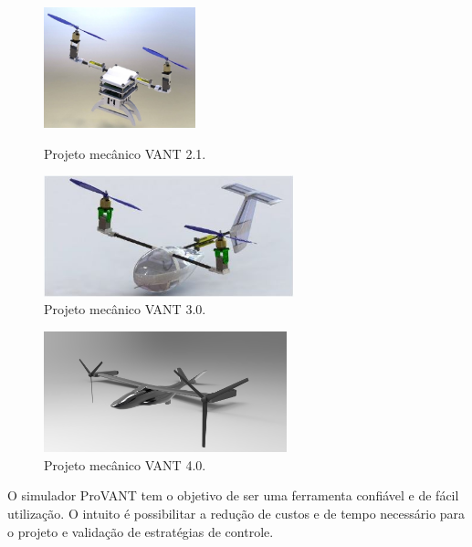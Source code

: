 	\begin{figure} [H]
		\centering
		\begin{minipage}{.5\textwidth}
			\centering
			\includegraphics[height=3.5cm]{figuras/VANT21}
			\caption{Projeto mecânico VANT 2.1.}
			\label{vant21}
		\end{minipage}%
		\begin{minipage}{.5\textwidth}
			\centering
			\includegraphics[height=3.5cm]{figuras/VANT3}
			\caption{Projeto mecânico VANT 3.0.}
			\label{vant3}
		\end{minipage}
	\end{figure}
								
	\begin{figure} [H]
		\centering
		\begin{minipage}{.5\textwidth}
			\centering
			\includegraphics[height=3.5cm]{figuras/VANT4}
			\caption{Projeto mecânico VANT 4.0.}
			\label{vant4}
		\end{minipage}
	\end{figure}

O simulador ProVANT tem o objetivo de ser uma ferramenta confiável e de fácil utilização. O intuito é possibilitar a redução de custos e de tempo necessário para o projeto e validação de estratégias de controle.